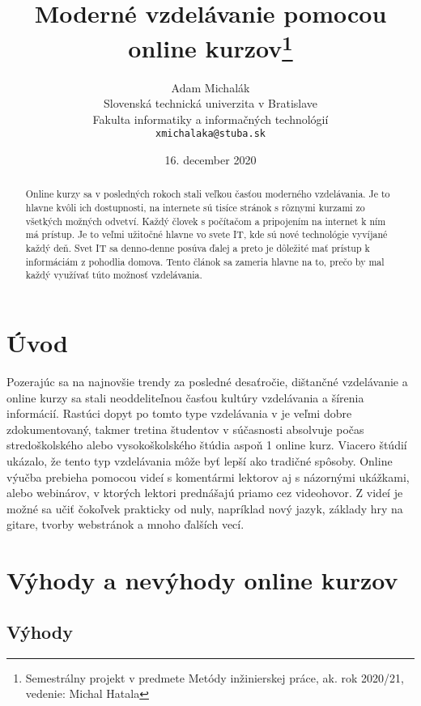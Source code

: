 \documentclass[10pt,twoside,slovak,a4paper]{article}
\title{Moderné vzdelávanie pomocou online kurzov\thanks{Semestrálny projekt v predmete Metódy inžinierskej práce, ak. rok 2020/21, vedenie: Michal Hatala}}
\author{Adam Michalák\\[2pt]
	{\small Slovenská technická univerzita v Bratislave}\\
	{\small Fakulta informatiky a informačných technológií}\\
	{\small \texttt{xmichalaka@stuba.sk}}
	}
\date{\small 16. december 2020}
\begin{document}
\maketitle

\begin{abstract}
Online kurzy sa v posledných rokoch stali veľkou časťou moderného vzdelávania. Je to hlavne kvôli ich dostupnosti, na internete sú tisíce stránok s rôznymi kurzami zo všetkých možných odvetví. Každý človek s počítačom a pripojením na internet k ním má prístup. Je to veľmi užitočné hlavne vo svete IT, kde sú nové technológie vyvíjané každý deň. Svet IT sa denno-denne posúva ďalej a preto je dôležité mať prístup k informáciám z pohodlia domova. Tento článok sa zameria hlavne na to, prečo by mal každý využívať túto možnosť vzdelávania.
\end{abstract}


\section{Úvod}
Pozerajúc sa na najnovšie trendy za posledné desaťročie, dištančné vzdelávanie a online kurzy sa stali neoddeliteľnou časťou kultúry vzdelávania a šírenia informácií. Rastúci dopyt po tomto type vzdelávania v je veľmi dobre zdokumentovaný, takmer tretina študentov v súčasnosti absolvuje počas stredoškolského alebo vysokoškolského štúdia aspoň 1 online kurz. Viacero štúdií ukázalo, že tento typ vzdelávania môže byť lepší ako tradičné spôsoby. Online výučba prebieha pomocou videí s komentármi lektorov aj s názornými ukážkami, alebo webinárov, v ktorých lektori prednášajú priamo cez videohovor. Z videí je možné sa učiť čokoľvek prakticky od nuly, napríklad nový jazyk, základy hry na gitare, tvorby webstránok a mnoho ďalších vecí. \cite{havrish2019implementation}

\section{Výhody a nevýhody online kurzov} \label{nejaka}

\subsection{Výhody}
\end{document}
